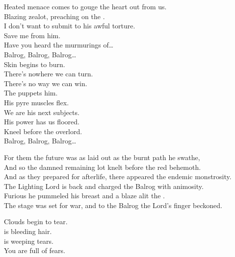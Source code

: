 
Heated menace comes to gouge the heart out from us. \\
Blazing zealot, preaching on the . \\
I don't want to submit to his awful torture. \\
Save me from him. \\
Have you heard the murmurings of… \\

Balrog, Balrog, Balrog… \\

Skin begins to burn. \\
There's nowhere we can turn. \\
There's no way we can win. \\
The  puppets him. \\

His pyre muscles flex. \\
We are his next subjects. \\
His power has us floored. \\
Kneel before the overlord. \\

Balrog, Balrog, Balrog… \\


For them the future was as laid out as the burnt path he swathe, \\
And so the damned remaining lot knelt before the red behemoth. \\

And as they prepared for afterlife, there appeared the endemic monstrosity. \\
The Lighting Lord is back and charged the Balrog with animosity. \\

Furious he pummeled his breast and a blaze alit the . \\
The stage was set for war, and to the Balrog the Lord's finger beckoned. \\





Clouds begin to tear. \\
 is bleeding hair. \\
 is weeping tears. \\
You are full of fears. \\

